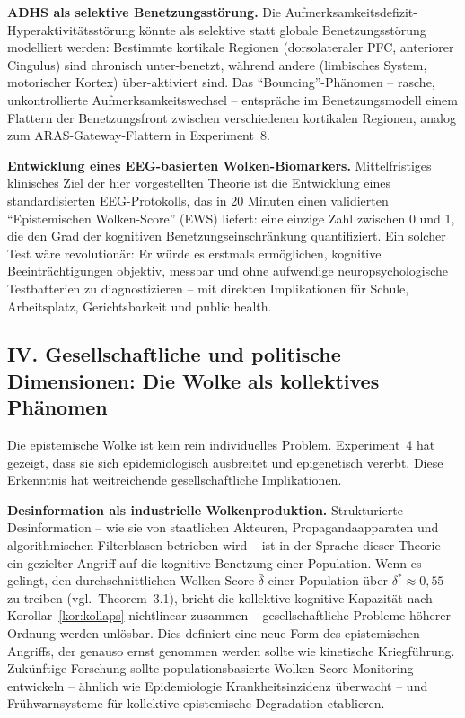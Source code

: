 ﻿\documentclass[12pt,a4paper]{report}
\theoremstyle{plain}
\theoremstyle{definition}
\theoremstyle{remark}
\begin{document}
	\textbf{ADHS als selektive Benetzungsstörung.}
	Die Aufmerksamkeitsdefizit-Hyperaktivitäts\-störung könnte
	als selektive statt globale Benetzungsstörung modelliert werden:
	Bestimmte kortikale Regionen (dorsolateraler PFC, anteriorer Cingulus)
	sind chronisch unter-benetzt, während andere (limbisches System,
	motorischer Kortex) über-aktiviert sind.
	Das ``Bouncing''-Phänomen -- rasche, unkontrollierte Aufmerksamkeitswechsel --
	entspräche im Benetzungsmodell einem Flattern der Benetzungsfront
	zwischen verschiedenen kortikalen Regionen, analog zum
	ARAS-Gateway-Flattern in Experiment~8.

	\textbf{Entwicklung eines EEG-basierten Wolken-Biomarkers.}
	Mittelfristiges klinisches Ziel der hier vorgestellten Theorie
	ist die Entwicklung eines standardisierten EEG-Proto\-kolls,
	das in 20 Minuten einen validierten ``Epistemischen Wolken-Score''
	(EWS) liefert: eine einzige Zahl zwischen 0 und 1,
	die den Grad der kognitiven Benetzungseinschränkung quantifiziert.
	Ein solcher Test wäre revolutionär: Er würde es erstmals ermöglichen,
	kognitive Beeinträchtigungen objektiv, messbar und ohne aufwendige
	neuropsychologische Testbatterien zu diagnostizieren --
	mit direkten Implikationen für Schule, Arbeitsplatz, Gerichtsbarkeit
	und public health.

	\subsection*{IV. Gesellschaftliche und politische Dimensionen:
		Die Wolke als kollektives Phänomen}

	Die epistemische Wolke ist kein rein individuelles Problem.
	Experiment~4 hat gezeigt, dass sie sich epidemiologisch ausbreitet
	und epigenetisch vererbt. Diese Erkenntnis hat weitreichende
	gesellschaftliche Implikationen.

	\textbf{Desinformation als industrielle Wolkenproduktion.}
	Strukturierte Desinformation -- wie sie von staatlichen Akteuren,
	Propagandaapparaten und algorithmischen Filterblasen betrieben wird --
	ist in der Sprache dieser Theorie ein gezielter Angriff auf die
	kognitive Benetzung einer Population.
	Wenn es gelingt, den durchschnittlichen Wolken-Score $\bar{\delta}$
	einer Population über $\delta^* \approx 0{,}55$ zu treiben
	(vgl.\ Theorem~3.1), bricht die kollektive kognitive Kapazität
	nach Korollar~\ref{kor:kollaps} nichtlinear zusammen --
	gesellschaftliche Probleme höherer Ordnung werden unlösbar.
	Dies definiert eine neue Form des epistemischen Angriffs,
	der genauso ernst genommen werden sollte wie kinetische Kriegführung.
	Zukünftige Forschung sollte populationsbasierte Wolken-Score-Monitoring
	entwickeln -- ähnlich wie Epidemiologie Krankheitsinzidenz überwacht --
	und Frühwarnsysteme für kollektive epistemische Degradation etablieren.
\end{document}
